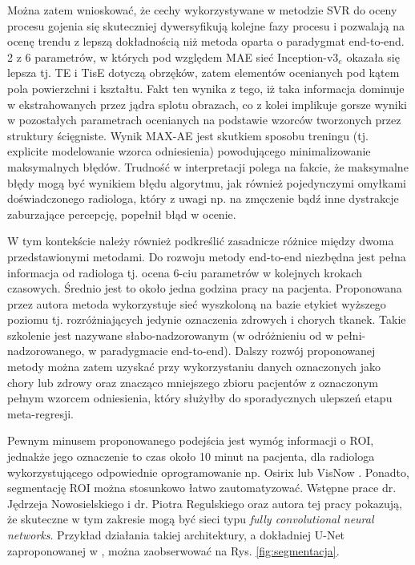Można zatem wnioskować, że cechy wykorzystywane w metodzie SVR do oceny procesu gojenia się skuteczniej dywersyfikują kolejne fazy procesu i pozwalają na ocenę trendu z lepszą dokładnością niż metoda oparta o paradygmat end-to-end. 2 z 6 parametrów, w których pod względem MAE sieć Inception-v3$_e$ okazała się lepsza tj. TE i TisE dotyczą obrzęków, zatem elementów ocenianych pod kątem pola powierzchni i kształtu. Fakt ten wynika z tego, iż taka informacja dominuje w ekstrahowanych przez jądra splotu obrazach, co z kolei implikuje gorsze wyniki w pozostałych parametrach ocenianych na podstawie wzorców tworzonych przez struktury ścięgniste. Wynik MAX-AE jest skutkiem sposobu treningu (tj. explicite modelowanie wzorca odniesienia) powodującego minimalizowanie maksymalnych błędów. Trudność w interpretacji polega na fakcie, że maksymalne błędy mogą być wynikiem błędu algorytmu, jak również pojedynczymi omyłkami doświadczonego radiologa, który z uwagi np. na zmęczenie bądź inne dystrakcje zaburzające percepcję, popełnił błąd w ocenie.  

W tym kontekście należy również podkreślić zasadnicze różnice między dwoma przedstawionymi metodami. Do rozwoju metody end-to-end niezbędna jest pełna informacja od radiologa tj. ocena 6-ciu parametrów w kolejnych krokach czasowych. Średnio jest to około jedna godzina pracy na pacjenta. Proponowana przez autora metoda wykorzystuje sieć wyszkoloną na bazie etykiet wyższego poziomu tj. rozróżniających jedynie oznaczenia zdrowych i chorych tkanek. Takie szkolenie jest nazywane słabo-nadzorowanym (w odróżnieniu od w pełni-nadzorowanego, w paradygmacie end-to-end). Dalszy rozwój proponowanej metody można zatem uzyskać przy wykorzystaniu danych oznaczonych jako chory lub zdrowy oraz znacząco mniejszego zbioru pacjentów z oznaczonym pełnym wzorcem odniesienia, który służyłby do sporadycznych ulepszeń etapu meta-regresji. 

Pewnym minusem proponowanego podejścia jest wymóg informacji o ROI, jednakże jego oznaczenie to czas około 10 minut na pacjenta, dla radiologa wykorzystującego odpowiednie oprogramowanie np. Osirix \cite{Rosset2004} lub VisNow \cite{Nowinski_Borucki_2014}. Ponadto, segmentację ROI można stosunkowo łatwo zautomatyzować. Wstępne prace dr. Jędrzeja Nowosielskiego i dr. Piotra Regulskiego oraz autora tej pracy pokazują, że skuteczne w tym zakresie mogą być sieci typu \textit{fully convolutional neural networks}. Przykład działania takiej architektury, a dokładniej U-Net zaproponowanej w \cite{Ronneberger2015}, można zaobserwować na Rys. \ref{fig:segmentacja}. 

